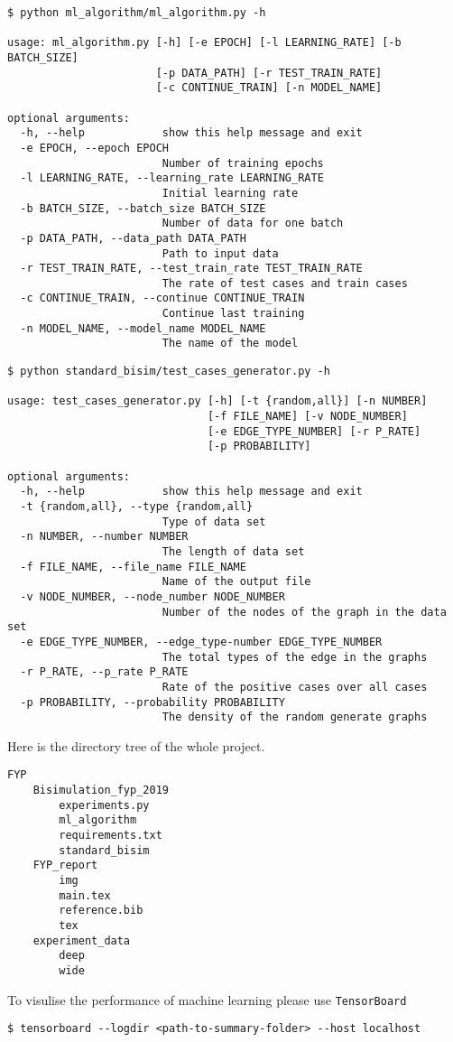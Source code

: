 \begin{verbatim}
$ python ml_algorithm/ml_algorithm.py -h

usage: ml_algorithm.py [-h] [-e EPOCH] [-l LEARNING_RATE] [-b BATCH_SIZE]
                       [-p DATA_PATH] [-r TEST_TRAIN_RATE] 
                       [-c CONTINUE_TRAIN] [-n MODEL_NAME]

optional arguments:
  -h, --help            show this help message and exit
  -e EPOCH, --epoch EPOCH
                        Number of training epochs
  -l LEARNING_RATE, --learning_rate LEARNING_RATE
                        Initial learning rate
  -b BATCH_SIZE, --batch_size BATCH_SIZE
                        Number of data for one batch
  -p DATA_PATH, --data_path DATA_PATH
                        Path to input data
  -r TEST_TRAIN_RATE, --test_train_rate TEST_TRAIN_RATE
                        The rate of test cases and train cases
  -c CONTINUE_TRAIN, --continue CONTINUE_TRAIN
                        Continue last training
  -n MODEL_NAME, --model_name MODEL_NAME
                        The name of the model
\end{verbatim}
\begin{verbatim}
$ python standard_bisim/test_cases_generator.py -h

usage: test_cases_generator.py [-h] [-t {random,all}] [-n NUMBER]
                               [-f FILE_NAME] [-v NODE_NUMBER]
                               [-e EDGE_TYPE_NUMBER] [-r P_RATE]
                               [-p PROBABILITY]

optional arguments:
  -h, --help            show this help message and exit
  -t {random,all}, --type {random,all}
                        Type of data set
  -n NUMBER, --number NUMBER
                        The length of data set
  -f FILE_NAME, --file_name FILE_NAME
                        Name of the output file
  -v NODE_NUMBER, --node_number NODE_NUMBER
                        Number of the nodes of the graph in the data set
  -e EDGE_TYPE_NUMBER, --edge_type-number EDGE_TYPE_NUMBER
                        The total types of the edge in the graphs
  -r P_RATE, --p_rate P_RATE
                        Rate of the positive cases over all cases
  -p PROBABILITY, --probability PROBABILITY
                        The density of the random generate graphs
\end{verbatim}

Here is the directory tree of the whole project.

\begin{verbatim}
FYP
    Bisimulation_fyp_2019
        experiments.py
        ml_algorithm
        requirements.txt
        standard_bisim
    FYP_report
        img
        main.tex
        reference.bib
        tex
    experiment_data
        deep
        wide
\end{verbatim}

To visulise the performance of machine learning please use \texttt{TensorBoard}
\begin{verbatim}
$ tensorboard --logdir <path-to-summary-folder> --host localhost
\end{verbatim}